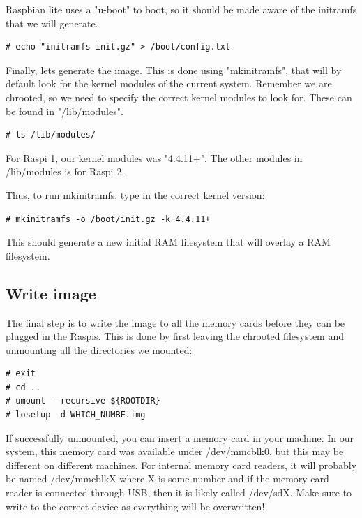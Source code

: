 Raspbian lite uses a "u-boot" to boot, so it should be made aware of the
initramfs that we will generate.

\begin{lstlisting}[]
# echo "initramfs init.gz" > /boot/config.txt
\end{lstlisting}
\FloatBarrier

Finally, lets generate the image. This is done using "mkinitramfs", that will
by default look for the kernel modules of the current system. Remember we are
chrooted, so we need to specify the correct kernel modules to look for. These
can be found in "/lib/modules".

\begin{lstlisting}[]
# ls /lib/modules/
\end{lstlisting}
\FloatBarrier

For \ac{Raspi} 1, our kernel modules was "4.4.11+". The other modules in /lib/modules
is for \ac{Raspi} 2.

Thus, to run mkinitramfs, type in the correct kernel version:

\begin{lstlisting}[]
# mkinitramfs -o /boot/init.gz -k 4.4.11+
\end{lstlisting}
\FloatBarrier

This should generate a new initial \ac{RAM} filesystem that will overlay a \ac{RAM} filesystem.

\subsection{Write image}

The final step is to write the image to all the memory cards before they can
be plugged in the \ac{Raspi}s. This is done by first leaving the chrooted filesystem
and unmounting all the directories we mounted:

\begin{lstlisting}[]
# exit
# cd ..
# umount --recursive ${ROOTDIR}
# losetup -d WHICH_NUMBE.img
\end{lstlisting}
\FloatBarrier

If successfully unmounted, you can insert a memory card in your machine. In our
system, this memory card was available under /dev/mmcblk0, but this may be
different on different machines. For internal memory card readers, it will
probably be named /dev/mmcblkX where X is some number and if the memory card
reader is connected through \ac{USB}, then it is likely called /dev/sdX.
Make sure to write to the correct device as everything will be overwritten!

